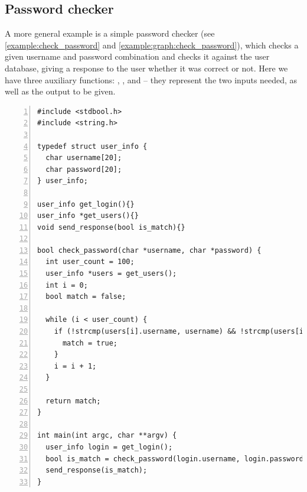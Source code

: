 \subsection{Password checker}\label{example:sec:check_password}
A more general example is a simple password checker (see \cref{example:check_password} and \cref{example:graph:check_password}), which checks a given username and password combination and checks it against the user database, giving a response to the user whether it was correct or not.
Here we have three auxiliary functions: , , and  -- they represent the two inputs needed, as well as the output to be given.

\begin{lstlisting}[float, style=dlmc, numbers=left, caption={Password checker}, label=example:check_password]
#include <stdbool.h>
#include <string.h>

typedef struct user_info {
  char username[20];
  char password[20];
} user_info;

user_info get_login(){}
user_info *get_users(){}
void send_response(bool is_match){}

bool check_password(char *username, char *password) {
  int user_count = 100;
  user_info *users = get_users();
  int i = 0;
  bool match = false;

  while (i < user_count) {
    if (!strcmp(users[i].username, username) && !strcmp(users[i].password, password)) {
      match = true;
    }
    i = i + 1;
  }

  return match;
}

int main(int argc, char **argv) {
  user_info login = get_login();
  bool is_match = check_password(login.username, login.password);
  send_response(is_match);
}
\end{lstlisting}


